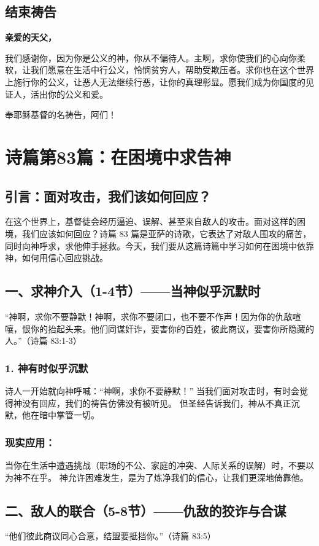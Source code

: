 \documentclass[a4paper, 12pt]{article}
\begin{document}
\subsection*{结束祷告}
\textbf{亲爱的天父，}

我们感谢你，因为你是公义的神，你从不偏待人。主啊，求你使我们的心向你柔软，让我们愿意在生活中行公义，怜悯贫穷人，帮助受欺压者。求你也在这个世界上施行你的公义，让恶人无法继续行恶，让你的真理彰显。愿我们成为你国度的见证人，活出你的公义和爱。

奉耶稣基督的名祷告，阿们！
\newpage
\section{诗篇第83篇：在困境中求告神}
\subsection*{引言：面对攻击，我们该如何回应？}
在这个世界上，基督徒会经历逼迫、误解、甚至来自敌人的攻击。面对这样的困境，我们应该如何回应？诗篇 83 篇是亚萨的诗歌，它表达了对敌人围攻的痛苦，同时向神呼求，求他伸手拯救。今天，我们要从这篇诗篇中学习如何在困境中依靠神，如何用信心回应挑战。
\subsection*{一、求神介入（1-4节）——当神似乎沉默时}
“神啊，求你不要静默！神啊，求你不要闭口，也不要不作声！因为你的仇敌喧嚷，恨你的抬起头来。他们同谋奸诈，要害你的百姓，彼此商议，要害你所隐藏的人。”（诗篇 83:1-3）

\subsubsection*{1. 神有时似乎沉默}
诗人一开始就向神呼喊：“神啊，求你不要静默！”
当我们面对攻击时，有时会觉得神没有回应，我们的祷告仿佛没有被听见。
但圣经告诉我们，神从不真正沉默，他在暗中掌管一切。
\subsubsection*{现实应用：}

当你在生活中遭遇挑战（职场的不公、家庭的冲突、人际关系的误解）时，不要以为神不在乎。
神允许困难发生，是为了炼净我们的信心，让我们更深地倚靠他。
\subsection*{二、敌人的联合（5-8节）——仇敌的狡诈与合谋}
“他们彼此商议同心合意，结盟要抵挡你。”（诗篇 83:5）
\end{document}
